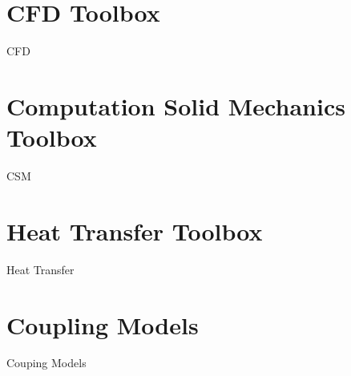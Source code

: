 \section[CFD]{CFD Toolbox}
\begin{frame}{CFD}

\end{frame}

\section[CSM]{Computation Solid Mechanics Toolbox}
\begin{frame}{CSM}

\end{frame}

\section[Heat Transfer]{Heat Transfer Toolbox}
\begin{frame}{Heat Transfer}

\end{frame}

\section{Coupling Models}
\begin{frame}{Couping Models}

\end{frame}


